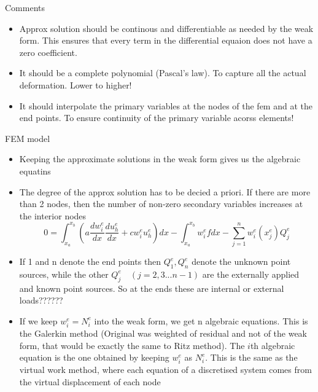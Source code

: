 	\begin{frame}{Comments}
		\begin{itemize}
			\item Approx solution should be continous and differentiable as needed by the weak form. This ensures that every term in the differential equaion does not have a zero coefficient.
			\item It should be a complete polynomial (Pascal's law). To capture all the actual deformation. Lower to higher!
			\item It should interpolate the primary variables at the nodes of the fem and at the end points. To ensure continuity of the primary variable acorss elements!		
			
		\end{itemize}
	\end{frame}


	\begin{frame}{FEM model}
		\begin{itemize}
			\item Keeping the approximate solutions in the weak form gives us the algebraic equatins
			\item The degree of the approx solution has to be decied a priori. If there are more than 2 nodes, then the number of non-zero secondary variables increases at the interior nodes
			\begin{equation}
				 0 = \int_{x_a}^{x_b} \left(a \frac{dw_i^e}{dx} \frac{du_h^e}{dx} + cw_i^eu_h^e\right)dx - \int_{x_a}^{x_b} w_i^ef dx - \sum_{j=1}^{n} w_i^e (x_j^e)Q_j^e
			\end{equation}
			\item If 1 and n denote the end points then $Q_1^e,Q_n^e$ denote the unknown point sources, while the other $Q_j^e \quad(j=2,3...n-1)$ are the externally applied and known point sources. So at the ends these are internal or external loads??????
			\item If we keep $w_i^e = N_i^e$ into the weak form, we get n algebraic equations. This is the Galerkin  method (Original was weighted of residual and not of the weak form, that would be exactly the same to Ritz method). The $i$th algebraic equation is the one obtained by keeping $w_i^e$ as $N_i^e$. This is the same as the virtual work method, where each equation of a discretised system comes from the virtual displacement of each node 
		\end{itemize}
	\end{frame}


